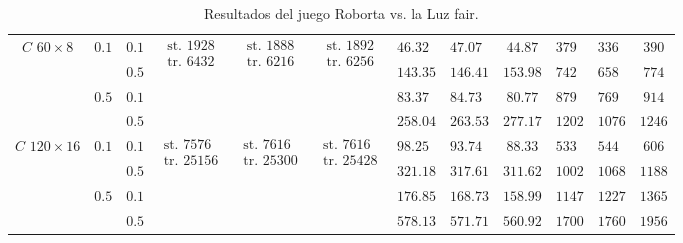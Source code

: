 \begin{table}[tp]
{\begin{tabular}{|c|c|c|c|c|c|g|h|c|g|h|c|}
       &  & $0.1$ &  &   &   & $46.32$ & $47.07$ & $44.87$ & $379$ & $336$ & $390$ \\ \hhline{|~|~|-|~|~|~|-|-|-|-|-|-|}
       & & $0.5$ & & & & $143.35$ & $146.41$ & $153.98$ & $742$ & $658$ & $774$ \\ \hhline{|~|-|-|~|~|~|-|-|-|-|-|-|}
       &  & $0.1$ & & & & $83.37$ & $84.73$ & $80.77$ & $879$ & $769$ & $914$ \\ \hhline{|~|~|-|~|~|~|-|-|-|-|-|-|}
       & & $0.5$ & & & & $258.04$ & $263.53$ & $277.17$ & $1202$ & $1076$ & $1246$ \\ \hline

       &  & $0.1$ &  &   &   & $98.25$ & $93.74$ & $88.33$ & $533$ & $544$ & $606$ \\ \hhline{|~|~|-|~|~|~|-|-|-|-|-|-|}
       & & $0.5$ & & & & $321.18$ & $317.61$ & $311.62$ & $1002$ & $1068$ & $1188$ \\ \hhline{|~|-|-|~|~|~|-|-|-|-|-|-|}
       &  & $0.1$ & & & & $176.85$ & $168.73$ & $158.99$ & $1147$ & $1227$ & $1365$\\ \hhline{|~|~|-|~|~|~|-|-|-|-|-|-|}
       & & $0.5$ & & & & $578.13$ & $571.71$ & $560.92$ & $1700$ & $1760$ & $1956$ \\ 

      \hline
    \end{tabular}
  }
  \caption{Resultados del juego Roborta vs. la Luz fair.}
  \label{table:resultsRobot}
\end{table}


